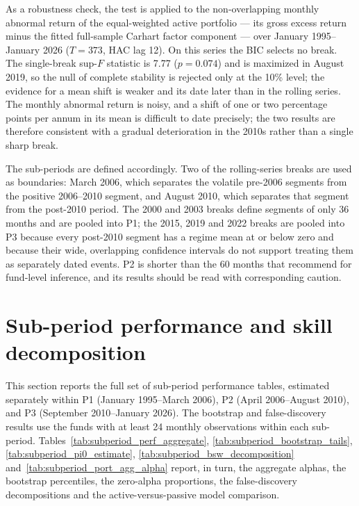 \documentclass[12pt, oneside]{report}
\begin{document}
As a robustness check, the test is applied to the non-overlapping monthly
abnormal return of the equal-weighted active portfolio --- its gross
excess return minus the fitted full-sample Carhart factor component ---
over January 1995--January 2026 ($T = 373$, HAC lag 12). On this series
the BIC selects no break. The single-break sup-$F$ statistic is 7.77
($p = 0.074$) and is maximized in August 2019, so the null of complete
stability is rejected only at the 10\% level; the evidence for a mean
shift is weaker and its date later than in the rolling series. The monthly abnormal return
is noisy, and a shift of one or two percentage points per annum in its
mean is difficult to date precisely; the two results are therefore
consistent with a gradual deterioration in the 2010s rather than a
single sharp break.

The sub-periods are defined accordingly. Two of the rolling-series
breaks are used as boundaries: March 2006, which separates the volatile
pre-2006 segments from the positive 2006--2010 segment, and August 2010,
which separates that segment from the post-2010 period. The 2000 and
2003 breaks define segments of only 36 months and are pooled into P1;
the 2015, 2019 and 2022 breaks are pooled into P3 because every post-2010
segment has a regime mean at or below zero and because their wide,
overlapping confidence intervals do not support treating them as
separately dated events. P2 is shorter than the
60 months that \textcite{BarrasScailletWermers2010} recommend for
fund-level inference, and its results should be read with corresponding
caution.

\section{Sub-period performance and skill decomposition}
\label{sec:subperiod_panels}

\noindent This section reports the full set of sub-period performance
tables, estimated separately within P1 (January 1995--March 2006), P2
(April 2006--August 2010), and P3 (September 2010--January 2026). The
bootstrap and false-discovery results use the funds with at least 24
monthly observations within each sub-period.
Tables~\ref{tab:subperiod_perf_aggregate}, \ref{tab:subperiod_bootstrap_tails},
\ref{tab:subperiod_pi0_estimate}, \ref{tab:subperiod_bsw_decomposition}
and~\ref{tab:subperiod_port_agg_alpha} report, in turn, the aggregate alphas,
the bootstrap percentiles, the zero-alpha proportions, the false-discovery
decompositions and the active-versus-passive model comparison.
\end{document}
